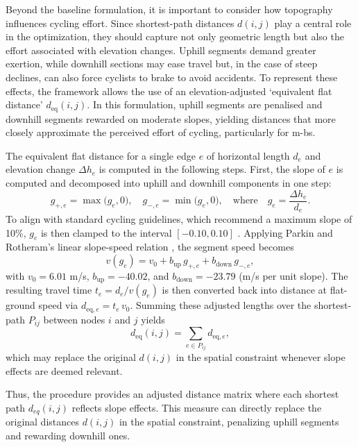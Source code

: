     Beyond the baseline formulation, it is important to consider how topography influences cycling effort. Since shortest-path distances $d(i,j)$ play a central role in the optimization, they should capture not only geometric length but also the effort associated with elevation changes. Uphill segments demand greater exertion, while downhill sections may ease travel but, in the case of steep declines, can also force cyclists to brake to avoid accidents. To represent these effects, the framework allows the use of an elevation-adjusted ‘equivalent flat distance’ $d_{\mathrm{eq}}(i,j)$. In this formulation, uphill segments are penalised and downhill segments rewarded on moderate slopes, yielding distances that more closely approximate the perceived effort of cycling, particularly for \acp{m-b}.

    The equivalent flat distance for a single edge \(e\) of horizontal length \(d_{e}\) and elevation change \(\Delta h_{e}\) is computed in the following steps. First, the slope of \(e\) is computed and decomposed into uphill and downhill components in one step:
        \[
        g_{+,e} = \max\!\bigl(g_{e},0\bigr), 
        \quad
        g_{-,e} = \min\!\bigl(g_{e},0\bigr),
        \quad\text{where}\quad
        g_{e} = \frac{\Delta h_{e}}{d_{e}}.
        \]
    To align with standard cycling guidelines, which recommend a maximum slope of 10\%, \(g_{e}\) is then clamped to the interval $[-0.10,0.10]$ \cite{AASHTO1999bicycle, CycleHighways2025, CROW2006}. Applying Parkin and Rotheram’s linear slope-speed relation \cite{Parkin2010}, the segment speed becomes  
        \[
        v(g_{e})=v_{0}+b_{\mathrm{up}}\,g_{+,e}+b_{\mathrm{down}}\,g_{-,e},
        \]
    with \(v_{0}=6.01\) m/s, \(b_{\mathrm{up}}=-40.02\), and \(b_{\mathrm{down}}=-23.79\) (m/s per unit slope). The resulting travel time \(t_{e}=d_{e}/v(g_{e})\) is then converted back into distance at flat-ground speed via \(d_{\mathrm{eq},e}=t_{e}\,v_{0}\). Summing these adjusted lengths over the shortest-path \(P_{ij}\) between nodes \(i\) and \(j\) yields  
        \[
        d_{\mathrm{eq}}(i,j)=\sum_{e\in P_{ij}}d_{\mathrm{eq},e},
        \]
    which may replace the original \(d(i,j)\) in the spatial constraint whenever slope effects are deemed relevant. 

    Thus, the procedure provides an adjusted distance matrix where each shortest path $d_{eq}(i,j)$ reflects slope effects. This measure can directly replace the original distances $d(i,j)$ in the spatial constraint, penalizing uphill segments and rewarding downhill ones.

